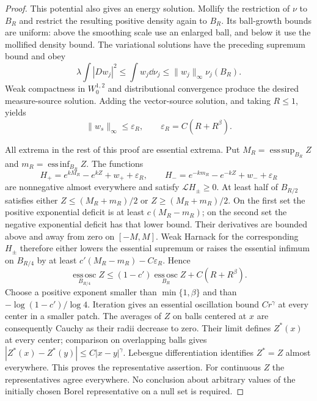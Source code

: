 \begin{proof}
This potential also gives an energy solution. Mollify the restriction
of $\nu$ to $B_R$ and restrict the resulting positive density again to
$B_R$. Its ball-growth bounds are uniform: above the smoothing scale
use an enlarged ball, and below it use the mollified density bound.
The variational solutions have the preceding supremum bound and obey
\[
 \lambda\int|Dw_j|^2\le\int w_j\dd\nu_j
              \le\|w_j\|_\infty\nu_j(B_R).
\]
Weak compactness in $W^{1,2}_0$ and distributional convergence produce
the desired measure-source solution. Adding the vector-source solution,
and taking $R\le1$, yields
\begin{equation}\label{n3:existence:correction-size}
 \|w_s\|_\infty\le\varepsilon_R,
 \qquad\varepsilon_R=C(R+R^\beta).
\end{equation}

All extrema in the rest of this proof are essential extrema. Put
$M_R=\operatorname*{ess\,sup}_{B_R}Z$ and
$m_R=\operatorname*{ess\,inf}_{B_R}Z$. The functions
\begin{equation}\label{n3:existence:exponential-deficits}
 H_+=e^{kM_R}-e^{kZ}+w_++\varepsilon_R,
 \qquad
 H_-=e^{-km_R}-e^{-kZ}+w_-+\varepsilon_R
\end{equation}
are nonnegative almost everywhere and satisfy $\mathcal L H_\pm\ge0$.
At least half of $B_{R/2}$ satisfies either
$Z\le(M_R+m_R)/2$ or $Z\ge(M_R+m_R)/2$.
On the first set the positive exponential deficit is at least
$c(M_R-m_R)$; on the second set the negative exponential deficit
has that lower bound. Their derivatives are bounded above and away
from zero on $[-M,M]$.
Weak Harnack for the corresponding $H_\pm$ therefore either lowers
the essential supremum or raises the essential infimum on $B_{R/4}$
by at least $c'(M_R-m_R)-C\varepsilon_R$. Hence
\begin{equation}\label{n3:existence:oscillation-contraction}
 \operatorname*{ess\,osc}_{B_{R/4}}Z
 \le(1-c')\operatorname*{ess\,osc}_{B_R}Z+C(R+R^\beta).
\end{equation}
Choose a positive exponent smaller than $\min\{1,\beta\}$ and than
$-\log(1-c')/\log4$. Iteration gives an essential oscillation bound
$Cr^\gamma$ at every center in a smaller patch.
The averages of $Z$ on balls centered at $x$ are consequently Cauchy
as their radii decrease to zero. Their limit defines $Z^*(x)$ at
every center; comparison on overlapping balls gives
$|Z^*(x)-Z^*(y)|\le C|x-y|^\gamma$.
Lebesgue differentiation identifies $Z^*=Z$ almost everywhere.
This proves the representative assertion. For continuous $Z$ the
representatives agree everywhere. No conclusion about arbitrary
values of the initially chosen Borel representative on a null set
is required.


\end{proof}
